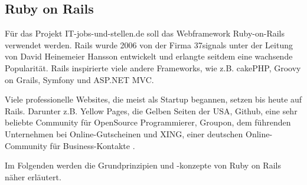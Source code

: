 
\subsection{Ruby on Rails}
\label{sec:rails}

Für das Projekt IT-jobs-und-stellen.de soll das Webframework Ruby-on-Rails verwendet werden. Rails wurde 2006 von der Firma 37signals unter der Leitung von David Heinemeier Hansson entwickelt und erlangte seitdem eine wachsende Popularität. Rails inspirierte viele andere Frameworks, wie z.B. cakePHP, Groovy on Grails, Symfony und ASP.NET MVC.

Viele professionelle Websites, die meist als Startup begannen, setzen bis heute auf Rails. Darunter z.B. Yellow Pages, die Gelben Seiten der USA, Github, eine sehr beliebte Community für OpenSource Programmierer,  Groupon, dem führenden Unternehmen bei Online-Gutscheinen und XING, einer deutschen Online-Community für Business-Kontakte \citep{ruby_on_rails_2011}.


Im Folgenden werden die Grundprinzipien und -konzepte von Ruby on Rails näher erläutert.

